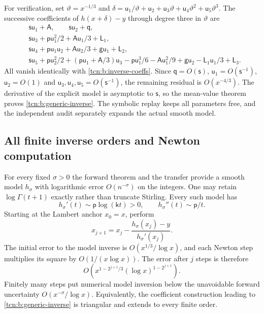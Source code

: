 \documentclass[11pt,letterpaper]{article}
\theoremstyle{remark}
\begin{document}
For verification, set $\vartheta=x^{-1/3}$ and $\delta=\mathsf u_1/\vartheta+\mathsf u_2+\mathsf u_3\vartheta+\mathsf u_4\vartheta^2+\mathsf u_5\vartheta^3$. The successive coefficients of $h(x+\delta)-y$ through degree three in $\vartheta$ are
\begin{align*}
 &\mathsf s\mathsf u_1+\mathsf A,\qquad \mathsf s\mathsf u_2+\mathsf q,\\
 &\mathsf s\mathsf u_3+\mathsf p\mathsf u_1^2/2+\mathsf A\mathsf u_1/3+\mathsf L_1,\\
 &\mathsf s\mathsf u_4+\mathsf p\mathsf u_1\mathsf u_2+\mathsf A\mathsf u_2/3+\mathsf g\mathsf u_1+\mathsf L_2,\\
 &\mathsf s\mathsf u_5+\mathsf p\mathsf u_2^2/2+(\mathsf p\mathsf u_1+\mathsf A/3)\mathsf u_3-\mathsf p\mathsf u_1^3/6-\mathsf A\mathsf u_1^2/9+\mathsf g\mathsf u_2-\mathsf L_1\mathsf u_1/3+\mathsf L_3.
\end{align*}
All vanish identically with \eqref{tcn:b:inverse-coeffs}. Since $\mathsf q=O(\mathsf s)$, $\mathsf u_1=O(\mathsf s^{-1})$, $\mathsf u_2=O(1)$ and $\mathsf u_3,\mathsf u_4,\mathsf u_5=O(\mathsf s^{-1})$, the remaining residual is $O(x^{-4/3})$. The derivative of the explicit model is asymptotic to $\mathsf s$, so the mean-value theorem proves \eqref{tcn:b:generic-inverse}. The symbolic replay keeps all parameters free, and the independent audit separately expands the actual smooth model.

\subsection{All finite inverse orders and Newton computation}
For every fixed $\sigma>0$ the forward theorem and the transfer provide a smooth model $h_\sigma$ with logarithmic error $O(n^{-\sigma})$ on the integers. One may retain $\log\Gamma(t+1)$ exactly rather than truncate Stirling. Every such model has
\[
 h_\sigma'(t)\sim \mathsf p\log(\mathsf kt)>0,\qquad h_\sigma''(t)\sim \mathsf p/t.
\]
Starting at the Lambert anchor $x_0=x$, perform
\[
 x_{j+1}=x_j-\frac{h_\sigma(x_j)-y}{h_\sigma'(x_j)}.
\]
The initial error to the model inverse is $O(x^{1/3}/\log x)$, and each Newton step multiplies its square by $O(1/(x\log x))$. The error after $j$ steps is therefore
\begin{equation}
 O\!\left(x^{1-2^{j+1}/3}(\log x)^{1-2^{j+1}}\right).       \label{tcn:b:newton}
\end{equation}
Finitely many steps put numerical model inversion below the unavoidable forward uncertainty $O(x^{-\sigma}/\log x)$. Equivalently, the coefficient construction leading to \eqref{tcn:b:generic-inverse} is triangular and extends to every finite order.
\end{document}
